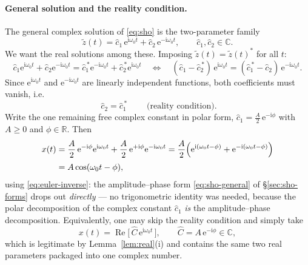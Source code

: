 \documentclass[11pt]{article}
\theoremstyle{plain}
\theoremstyle{definition}
\theoremstyle{remark}
\newcommand{\ee}{\mathrm{e}}
\newcommand{\ii}{\mathrm{i}}
\newcommand{\Rre}{\operatorname{Re}}
\begin{document}
\paragraph{General solution and the reality condition.}
The general complex solution of \eqref{eq:sho} is the two-parameter family
\begin{equation}
  \tilde z(t) = \hat c_1\, \ee^{\ii\omega_0 t} + \hat c_2\, \ee^{-\ii\omega_0 t},
  \qquad \hat c_1, \hat c_2 \in \mathbb{C}.
  \label{eq:sho-complex-general}
\end{equation}
We want the real solutions among these. Imposing
$\tilde z(t) = \tilde z(t)^{*}$ for all $t$:
\begin{equation}
  \hat c_1 \ee^{\ii\omega_0 t} + \hat c_2 \ee^{-\ii\omega_0 t}
  = \hat c_1^{\,*} \ee^{-\ii\omega_0 t} + \hat c_2^{\,*} \ee^{\ii\omega_0 t}
  \quad\Longleftrightarrow\quad
  (\hat c_1 - \hat c_2^{\,*})\,\ee^{\ii\omega_0 t}
  = (\hat c_1^{\,*} - \hat c_2)\,\ee^{-\ii\omega_0 t}.
\end{equation}
Since $\ee^{\ii\omega_0 t}$ and $\ee^{-\ii\omega_0 t}$ are linearly
independent functions, both coefficients must vanish, i.e.
\begin{equation}
  \boxed{\;\hat c_2 = \hat c_1^{\,*}\;}
  \qquad\text{(reality condition)}.
  \label{eq:reality}
\end{equation}
Write the one remaining free complex constant in polar form,
$\hat c_1 = \tfrac{A}{2}\,\ee^{-\ii\phi}$ with $A\ge 0$ and $\phi\in\mathbb{R}$.
Then
\begin{align}
  x(t)
  &= \frac{A}{2}\,\ee^{-\ii\phi}\ee^{\ii\omega_0 t}
   + \frac{A}{2}\,\ee^{+\ii\phi}\ee^{-\ii\omega_0 t}
  = \frac{A}{2}\Bigl(\ee^{\ii(\omega_0 t-\phi)} + \ee^{-\ii(\omega_0 t-\phi)}\Bigr)
  \nonumber\\[2pt]
  &= A\cos(\omega_0 t - \phi),
\end{align}
using \eqref{eq:euler-inverse}: the amplitude--phase form
\eqref{eq:sho-general} of \S\ref{sec:sho-forms} drops out \emph{directly} ---
no trigonometric identity was needed, because the polar decomposition of the
complex constant $\hat c_1$ \emph{is} the amplitude--phase decomposition.
Equivalently, one may skip the reality condition and simply take
\begin{equation}
  x(t) = \Rre\bigl[\,\hat C\,\ee^{\ii\omega_0 t}\,\bigr],
  \qquad \hat C = A\,\ee^{-\ii\phi} \in \mathbb{C},
\end{equation}
which is legitimate by Lemma~\ref{lem:real}(i) and contains the same two real
parameters packaged into one complex number.
\end{document}
